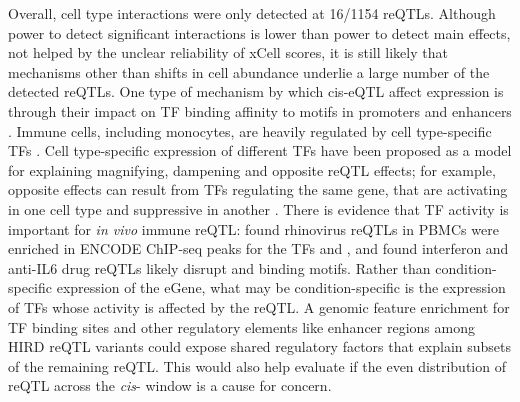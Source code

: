 %
%



Overall, cell type interactions were only detected at 16/1154 reQTLs.
Although power to detect significant interactions is lower than power to detect main effects,
not helped by the unclear reliability of xCell scores,
it is still likely that mechanisms other than shifts in cell abundance underlie a large number of the detected reQTLs.
One type of mechanism by which cis-eQTL affect expression is through their impact on \gls{TF} binding affinity to motifs in promoters and enhancers \autocite{pai2015GeneticMechanisticBasis}.
Immune cells, including monocytes, are heavily regulated by cell type-specific \glspl{TF} \autocite{choudhury2016IdentifyingCellTypeSpecific}.
Cell type-specific expression of different \glspl{TF} have been proposed as a model for explaining magnifying, dampening and opposite reQTL effects;
for example, opposite effects can result from \glspl{TF} regulating the same gene, that are activating in one cell type and suppressive in another \autocite{fu2012UnravelingRegulatoryMechanisms}.
There is evidence that \gls{TF} activity is important for \textit{in vivo} immune reQTL:
\autocite{caliskan2015HostGeneticVariation} found rhinovirus reQTLs in \glspl{PBMC} were enriched in ENCODE ChIP-seq peaks for the \glspl{TF}  and ,
and \autocite{davenport2018DiscoveringVivoCytokineeQTL} found interferon and anti-IL6 drug reQTLs likely disrupt  and  binding motifs.
Rather than condition-specific expression of the eGene, what may be condition-specific is the expression of \glspl{TF} whose activity is affected by the reQTL.
A genomic feature enrichment for TF binding sites and other regulatory elements like enhancer regions among HIRD reQTL variants could expose shared regulatory factors that explain subsets of the remaining reQTL.
This would also help evaluate if the even distribution of reQTL across the \textit{cis}- window is a cause for concern.

